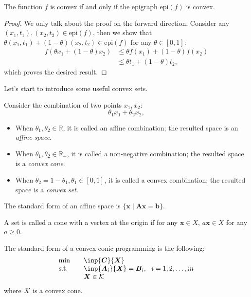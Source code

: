 \begin{proposition}
The function $f$ is convex if and only if the epigraph $\text{epi}(f)$ is convex.
\end{proposition}
\begin{proof}
We only talk about the proof on the forward direction.
Consider any $(x_1,t_1), (x_2,t_2)\in \text{epi}(f)$, then we show that $\theta(x_1,t_1)+(1-\theta)(x_2,t_2)\in \text{epi}(f)$ for any $\theta\in[0,1]$:
\begin{align*}
f(\theta x_1 + (1-\theta)x_2)&\le \theta f(x_1) + (1-\theta)f(x_2)\\
&\le \theta t_1 + (1-\theta)t_2,
\end{align*}
which proves the desired result.
\end{proof}

Let's start to introduce some useful convex sets.
\begin{definition}
Consider the combination of two points $x_1,x_2$:
\[
\theta_1 x_1 + \theta_2x_2,
\]
\begin{itemize}
\item
When $\theta_1,\theta_2\in\mathbb{R}$, it is called an affine combination;
the resulted space is an \emph{affine space}.
\item
When $\theta_1,\theta_2\in\mathbb{R}_+$, it is called a non-negative combination;
the resulted space is a \emph{convex cone}.
\item
When $\theta_2=1-\theta_1,\theta_1\in[0,1]$, it is called a convex combination;
the resulted space is a \emph{convex set}.
\end{itemize}
\end{definition}

\begin{definition}
The standard form of an affine space is $\{\bm x\mid\bm{Ax}=\bm b\}$.
\end{definition}

\begin{definition}[Cone]
A set is called a cone with a vertex at the origin if 
for any $\bm x\in X$, $a\bm x\in X$ for any $a\ge0$.
\end{definition}

The standard form of a convex conic programming is the following:
\[
\begin{array}{ll}
\min&\quad\inp{\bm C}{\bm X}\\
\mbox{s.t.}&\quad \inp{\bm A_i}{\bm X}=\bm B_i,~~i=1,2,\dots,m\\
&\quad \bm X\in\mathcal{K}
\end{array}
\]
where $\mathcal{K}$ is a convex cone.

